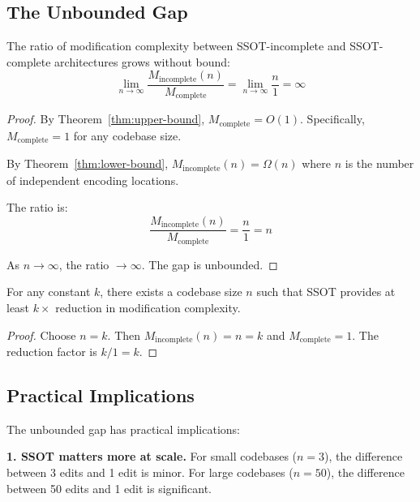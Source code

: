 \subsection{The Unbounded Gap}\label{sec:gap}

\begin{theorem}\label{thm:unbounded-gap}
The ratio of modification complexity between SSOT-incomplete and SSOT-complete architectures grows without bound:
\[
\lim_{n \to \infty} \frac{M_{\text{incomplete}}(n)}{M_{\text{complete}}} = \lim_{n \to \infty} \frac{n}{1} = \infty
\]
\end{theorem}

\begin{proof}
By Theorem~\ref{thm:upper-bound}, $M_{\text{complete}} = O(1)$. Specifically, $M_{\text{complete}} = 1$ for any codebase size.

By Theorem~\ref{thm:lower-bound}, $M_{\text{incomplete}}(n) = \Omega(n)$ where $n$ is the number of independent encoding locations.

The ratio is:
\[
\frac{M_{\text{incomplete}}(n)}{M_{\text{complete}}} = \frac{n}{1} = n
\]

As $n \to \infty$, the ratio $\to \infty$. The gap is unbounded.
\end{proof}

\begin{corollary}\label{cor:arbitrary-reduction}
For any constant $k$, there exists a codebase size $n$ such that SSOT provides at least $k\times$ reduction in modification complexity.
\end{corollary}

\begin{proof}
Choose $n = k$. Then $M_{\text{incomplete}}(n) = n = k$ and $M_{\text{complete}} = 1$. The reduction factor is $k/1 = k$.
\end{proof}

\subsection{Practical Implications}\label{sec:practical-implications}

The unbounded gap has practical implications:

\textbf{1. SSOT matters more at scale.} For small codebases ($n = 3$), the difference between 3 edits and 1 edit is minor. For large codebases ($n = 50$), the difference between 50 edits and 1 edit is significant.

